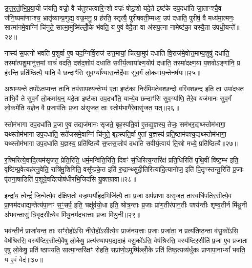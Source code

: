 उ॒त्त॒र॒तो॒भि॒प्र॒या॒यी ज॑यति॒ वज्रो॒ वै च॑तुश्चत्वारि॒ꣳ॒शो वज्रः॑ षोड॒शो यदे॒ते इष्ट॑के उप॒दधा॑ति जा॒ताꣳश्चै॒व ज॑नि॒ष्यमा॑णाꣳश्च॒ भ्रातृ॑व्यान्प्र॒णुद्य॒ वज्र॒मनु॒ प्र ह॑रति॒ स्तृत्यै॒ पुरी॑षवती॒म्मध्य॒ उप॑ दधाति॒ पुरी॑षं॒ वै मध्य॑मा॒त्मनः॒ सात्मा॑नमे॒वाग्निं चि॑नुते॒ सात्मा॒मुष्मि॑ल्लोँ॒के भ॑वति॒ य ए॒वं वेदै॒ता वा अ॑सप॒त्ना नामेष्ट॑का॒ यस्यै॒ता उ॑पधी॒यन्ते᳚॥२४॥

नास्य॑ स॒पत्नो॑ भवति प॒शुर्वा ए॒ष यद॒ग्निर्वि॒राज॑ उत्त॒मायां॒ चित्या॒मुप॑ दधाति वि॒राज॑मे॒वोत्त॒माम्प॒शुषु॑ दधाति॒ तस्मा᳚त्पशु॒मानु॑त्त॒मां वाचं॑ वदति॒ दश॑द॒शोप॑ दधाति सवीर्य॒त्वाया᳚क्ष्ण॒योप॑ दधाति॒ तस्मा॑दक्ष्ण॒या प॒शवो\-ऽङ्गा॑नि॒ प्र ह॑रन्ति॒ प्रति॑ष्ठित्यै॒ यानि॒ वै छन्दाꣳ॑सि सुव॒र्ग्या᳚ण्यास॒न्तैर्दे॒वाः सु॑व॒र्गं लो॒कमा॑य॒न्तेनर्\mbox{}ष॑यः॥२५॥

अ॒श्रा॒म्य॒न्ते तपो॑\-ऽतप्यन्त॒ तानि॒ तप॑सापश्य॒न्तेभ्य॑ ए॒ता इष्ट॑का॒ निर॑मिम॒तेव॒श्छन्दो॒ वरि॑व॒श्छन्द॒ इति॒ ता उपा॑दधत॒ ताभि॒र्वै ते सु॑व॒र्गं लो॒कमा॑य॒न्॒ यदे॒ता इष्ट॑का उप॒दधा॑ति॒ यान्ये॒व छन्दाꣳ॑सि सुव॒र्ग्या॑णि॒ तैरे॒व यज॑मानः सुव॒र्गं लो॒कमे॑ति य॒ज्ञेन॒ वै प्र॒जाप॑तिः प्र॒जा अ॑सृजत॒ ताः स्तोम॑भागैरे॒वासृ॑जत॒ यत्॥२६॥

स्तोम॑भागा उप॒दधा॑ति प्र॒जा ए॒व तद्यज॑मानः सृजते॒ बृह॒स्पति॒र्वा ए॒तद्य॒ज्ञस्य॒ तेजः॒ सम॑भर॒द्यथ्स्तोम॑भागा॒ यथ्स्तोम॑भागा उप॒दधा॑ति॒ सते॑जसमे॒वाग्निं चि॑नुते॒ बृह॒स्पति॒र्वा ए॒तां य॒ज्ञस्य॑ प्रति॒ष्ठाम॑पश्य॒द्यथ्स्तोम॑भागा॒ यथ्स्तोम॑भागा उप॒दधा॑ति य॒ज्ञस्य॒ प्रति॑ष्ठित्यै स॒प्तस॒प्तोप॑ दधाति सवीर्य॒त्वाय॑ ति॒स्रो मध्ये॒ प्रति॑ष्ठित्यै॥२७॥

{\anuvakamend[{उ॒त्त॒र॒तो ध॑त्ते॒ तस्मा॑दुपधी॒यन्त॒ ऋष॑यो\-ऽसृजत॒ यत्त्रिच॑त्वारिꣳशच्च॥५॥}]}

र॒श्मिरित्ये॒वादि॒त्यम॑सृजत॒ प्रेति॒रिति॒ धर्म॒मन्वि॑ति॒रिति॒ दिवꣳ॑ सं॒धिरित्य॒न्तरि॑क्षं प्रति॒धिरिति॑ पृथि॒वीं वि॑ष्ट॒म्भ इति॒ वृष्टि॑म्प्र॒वेत्यह॑रनु॒वेति॒ रात्रि॑मु॒शिगिति॒ वसू᳚न्प्रके॒त इति॑ रु॒द्रान्थ्सु॑दी॒तिरित्या॑दि॒त्यानोज॒ इति॑ पि॒तॄꣳस्तन्तु॒रिति॑ प्र॒जाः पृ॑तना॒षाडिति॑ प॒शून्रे॒वदित्योष॑धीरभि॒जिद॑सि यु॒क्तग्रा॑वा॥२८॥

इन्द्रा॑य॒ त्वेन्द्रं॑ जि॒न्वेत्ये॒व द॑क्षिण॒तो वज्र॒म्पर्यौ॑हद॒भिजि॑त्यै॒ ताः प्र॒जा अप॑प्राणा असृजत॒ तास्वधि॑पतिर॒सीत्ये॒व प्रा॒णम॑दधाद्य॒न्तेत्य॑पा॒नꣳ स॒ꣳ॒सर्प॒ इति॒ चक्षु॑र्वयो॒धा इति॒ श्रोत्र॒न्ताः प्र॒जाः प्रा॑ण॒तीर॑पान॒तीः पश्य॑न्तीः शृण्व॒तीर्न मि॑थु॒नी अ॑भव॒न्तासु॑ त्रि॒वृद॒सीत्ये॒व मि॑थु॒नम॑दधा॒त्ताः प्र॒जा मि॑थु॒नी॥२९॥

भव॑न्ती॒र्न प्राजा॑यन्त॒ ताः सꣳ॑रो॒हो॑\-ऽसि नीरो॒हो॑\-ऽसीत्ये॒व प्राज॑नय॒त्ताः प्र॒जाः प्रजा॑ता॒ न प्रत्य॑तिष्ठ॒न्ता व॑सु॒को॑\-ऽसि॒ वेष॑श्रिरसि॒ वस्य॑ष्टिर॒सीत्ये॒वैषु लो॒केषु॒ प्रत्य॑स्थापय॒द्यदाह॑ वसु॒को॑\-ऽसि॒ वेष॑श्रिरसि॒ वस्य॑ष्टिर॒सीति॑ प्र॒जा ए॒व प्रजा॑ता ए॒षु लो॒केषु॒ प्रति॑ ष्ठापयति॒ सात्मा॒न्तरि॑क्षꣳ रोहति॒ सप्रा॑णो॒\-ऽमुष्मि॑ल्लोँ॒के प्रति॑ तिष्ठ॒त्यव्य॑र्धुकः प्राणापा॒ना\-भ्यां᳚ भवति॒ य ए॒वं वेद॑॥३०॥

